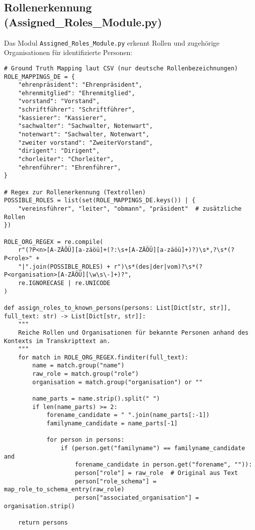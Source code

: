 \documentclass{article}
\begin{document}
\subsection{Rollenerkennung (Assigned\_Roles\_Module.py)}
Das Modul \texttt{Assigned\_Roles\_Module.py} erkennt Rollen und zugehörige Organisationen für identifizierte Personen:

\begin{tcolorbox}[title=Rollenerkennung für Personen]
\begin{lstlisting}[style=pythonstyle]
# Ground Truth Mapping laut CSV (nur deutsche Rollenbezeichnungen)
ROLE_MAPPINGS_DE = {
    "ehrenpräsident": "Ehrenpräsident",
    "ehrenmitglied": "Ehrenmitglied",
    "vorstand": "Vorstand",
    "schriftführer": "Schriftführer",
    "kassierer": "Kassierer",
    "sachwalter": "Sachwalter, Notenwart",
    "notenwart": "Sachwalter, Notenwart",
    "zweiter vorstand": "ZweiterVorstand",
    "dirigent": "Dirigent",
    "chorleiter": "Chorleiter",
    "ehrenführer": "Ehrenführer",
}

# Regex zur Rollenerkennung (Textrollen)
POSSIBLE_ROLES = list(set(ROLE_MAPPINGS_DE.keys()) | {
    "vereinsführer", "leiter", "obmann", "präsident"  # zusätzliche Rollen
})

ROLE_ORG_REGEX = re.compile(
    r"(?P<n>[A-ZÄÖÜ][a-zäöü]+(?:\s+[A-ZÄÖÜ][a-zäöü]+)?)\s*,?\s*(?P<role>" + 
    "|".join(POSSIBLE_ROLES) + r")\s*(des|der|vom)?\s*(?P<organisation>[A-ZÄÖÜ][\w\s\-]+)?",
    re.IGNORECASE | re.UNICODE
)

def assign_roles_to_known_persons(persons: List[Dict[str, str]], full_text: str) -> List[Dict[str, str]]:
    """
    Reiche Rollen und Organisationen für bekannte Personen anhand des Kontexts im Transkripttext an.
    """
    for match in ROLE_ORG_REGEX.finditer(full_text):
        name = match.group("name")
        raw_role = match.group("role")
        organisation = match.group("organisation") or ""

        name_parts = name.strip().split(" ")
        if len(name_parts) >= 2:
            forename_candidate = " ".join(name_parts[:-1])
            familyname_candidate = name_parts[-1]

            for person in persons:
                if (person.get("familyname") == familyname_candidate and
                    forename_candidate in person.get("forename", "")):
                    person["role"] = raw_role  # Original aus Text
                    person["role_schema"] = map_role_to_schema_entry(raw_role)
                    person["associated_organisation"] = organisation.strip()

    return persons
\end{lstlisting}
\end{tcolorbox}
\end{document}
